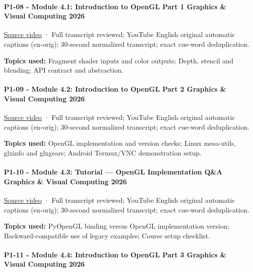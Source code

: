 \paragraph{P1-08 - Module 4.1: Introduction to OpenGL Part 1 Graphics \& Visual Computing 2026}\label{p1-08---module-4.1-introduction-to-opengl-part-1-graphics-visual-computing-2026}

\href{https://www.youtube.com/watch?v=I1VFptM0obM}{Source video} · Full transcript reviewed; YouTube English original automatic captions (en-orig); 30-second normalized transcript; exact cue-word deduplication.

\textbf{Topics used:} Fragment shader inputs and color outputs; Depth, stencil and blending; API contract and abstraction.

\paragraph{P1-09 - Module 4.2: Introduction to OpenGL Part 2 Graphics \& Visual Computing 2026}\label{p1-09---module-4.2-introduction-to-opengl-part-2-graphics-visual-computing-2026}

\href{https://www.youtube.com/watch?v=CpN9JORFZ7s}{Source video} · Full transcript reviewed; YouTube English original automatic captions (en-orig); 30-second normalized transcript; exact cue-word deduplication.

\textbf{Topics used:} OpenGL implementation and version checks; Linux mesa-utils, glxinfo and glxgears; Android Termux/VNC demonstration setup.

\paragraph{P1-10 - Module 4.3: Tutorial --- OpenGL Implementation Q\&A Graphics \& Visual Computing 2026}\label{p1-10---module-4.3-tutorial-opengl-implementation-qa-graphics-visual-computing-2026}

\href{https://www.youtube.com/watch?v=Mt8QU6JWY20}{Source video} · Full transcript reviewed; YouTube English original automatic captions (en-orig); 30-second normalized transcript; exact cue-word deduplication.

\textbf{Topics used:} PyOpenGL binding versus OpenGL implementation version; Backward-compatible use of legacy examples; Course setup checklist.

\paragraph{P1-11 - Module 4.4: Introduction to OpenGL Part 3 Graphics \& Visual Computing 2026}\label{p1-11---module-4.4-introduction-to-opengl-part-3-graphics-visual-computing-2026}

